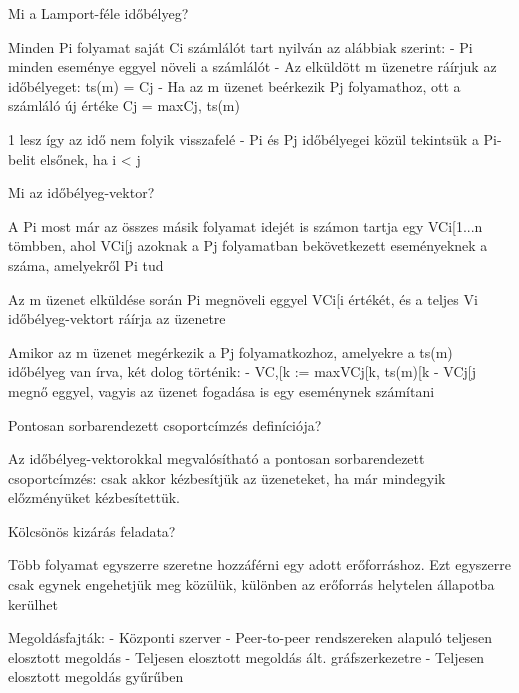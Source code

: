 \documentclass[12pt]{article}
\begin{document}
\begin{description}
        \item  Mi a Lamport-féle időbélyeg?
        \item Minden Pi folyamat saját Ci számlálót tart nyilván az alábbiak szerint: 
            - Pi minden eseménye eggyel növeli a számlálót
            - Az elküldött m üzenetre ráírjuk az időbélyeget: ts(m) = Cj
            - Ha az m üzenet beérkezik Pj folyamathoz, ott a számláló új értéke Cj = max{Cj, ts(m)}\item1 lesz így az idő nem folyik visszafelé
            - Pi és Pj időbélyegei közül tekintsük a Pi-belit elsőnek, ha i < j
        \item  Mi az időbélyeg-vektor?
        \item A Pi most már az összes másik folyamat idejét is számon tartja egy VCi[1...n tömbben,
                ahol VCi[j azoknak a Pj folyamatban bekövetkezett eseményeknek a száma, amelyekről Pi tud
                \item Az m üzenet elküldése során Pi megnöveli eggyel  VCi[i értékét, és a teljes Vi időbélyeg-vektort ráírja az üzenetre
                    \item Amikor az m üzenet megérkezik a Pj folyamatkozhoz, amelyekre a ts(m) időbélyeg van írva, két dolog történik:
                        - VC,[k := max{VCj[k, ts(m)[k}
                                    - VCj[j megnő eggyel, vagyis az üzenet fogadása is egy eseménynek számítani
                                    \item  Pontosan sorbarendezett csoportcímzés definíciója?
                                    \item Az időbélyeg-vektorokkal megvalósítható a pontosan sorbarendezett csoportcímzés: csak akkor kézbesítjük az üzeneteket,
                                        ha már mindegyik előzményüket kézbesítettük.
                                    \item  Kölcsönös kizárás feladata?
                                    \item Több folyamat egyszerre szeretne hozzáférni egy adott erőforráshoz. Ezt egyszerre csak egynek engehetjük meg közülük,
                                        különben az erőforrás helytelen állapotba kerülhet
                                    \item Megoldásfajták: 
                                        - Központi szerver
                                        - Peer-to-peer rendszereken alapuló teljesen elosztott megoldás
                                        - Teljesen elosztott megoldás ált. gráfszerkezetre
                                        - Teljesen elosztott megoldás gyűrűben

\end{description}
\end{document}
